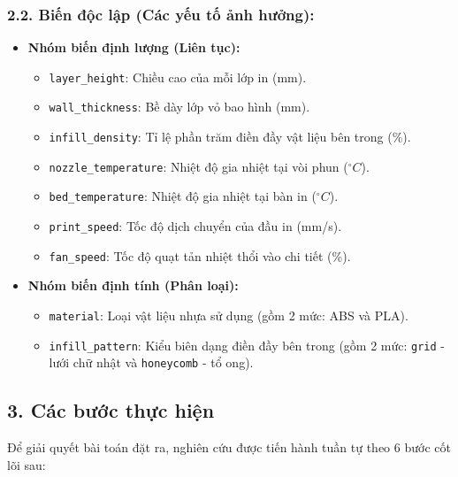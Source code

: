 \subsubsection{2.2. Biến độc lập (Các yếu tố ảnh hưởng):}
\begin{itemize}
    \item \textbf{Nhóm biến định lượng (Liên tục):}
    \begin{itemize}
        \item \texttt{layer\_height}: Chiều cao của mỗi lớp in (mm).
        \item \texttt{wall\_thickness}: Bề dày lớp vỏ bao hình (mm).
        \item \texttt{infill\_density}: Tỉ lệ phần trăm điền đầy vật liệu bên trong (\%).
        \item \texttt{nozzle\_temperature}: Nhiệt độ gia nhiệt tại vòi phun ($^\circ C$).
        \item \texttt{bed\_temperature}: Nhiệt độ gia nhiệt tại bàn in ($^\circ C$).
        \item \texttt{print\_speed}: Tốc độ dịch chuyển của đầu in (mm/s).
        \item \texttt{fan\_speed}: Tốc độ quạt tản nhiệt thổi vào chi tiết (\%).
    \end{itemize}
    \item \textbf{Nhóm biến định tính (Phân loại):}
    \begin{itemize}
        \item \texttt{material}: Loại vật liệu nhựa sử dụng (gồm 2 mức: ABS và PLA).
        \item \texttt{infill\_pattern}: Kiểu biên dạng điền đầy bên trong (gồm 2 mức: \texttt{grid} - lưới chữ nhật và \texttt{honeycomb} - tổ ong).
    \end{itemize}
\end{itemize}

\subsection{3. Các bước thực hiện}

Để giải quyết bài toán đặt ra, nghiên cứu được tiến hành tuần tự theo 6 bước cốt lõi sau:

